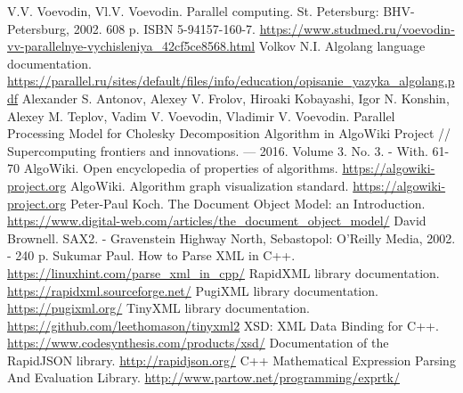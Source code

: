 %
%

\begin{thebibliography}{}




V.V. Voevodin, Vl.V. Voevodin. Parallel computing. St. Petersburg: BHV-Petersburg, 2002. 608 p. ISBN 5-94157-160-7. \url{https://www.studmed.ru/voevodin-vv-parallelnye-vychisleniya\_42cf5ce8568.html}
Volkov N.I. Algolang language documentation. \url{https://parallel.ru/sites/default/files/info/education/opisanie\_yazyka\_algolang.pdf}
Alexander S. Antonov, Alexey V. Frolov, Hiroaki Kobayashi, Igor N. Konshin, Alexey M. Teplov, Vadim V. Voevodin, Vladimir V. Voevodin. Parallel Processing Model for Cholesky Decomposition Algorithm in AlgoWiki Project // Supercomputing frontiers and innovations. — 2016. Volume 3. No. 3. - With. 61-70
AlgoWiki. Open encyclopedia of properties of algorithms. \url{https://algowiki-project.org}
AlgoWiki. Algorithm graph visualization standard. \url{https://algowiki-project.org}
Peter-Paul Koch. The Document Object Model: an Introduction. \url{https://www.digital-web.com/articles/the\_document\_object\_model/}
David Brownell. SAX2. - Gravenstein Highway North, Sebastopol: O’Reilly Media, 2002. - 240 p.
Sukumar Paul. How to Parse XML in C++. \url{https://linuxhint.com/parse\_xml\_in\_cpp/}
RapidXML library documentation. \url{https://rapidxml.sourceforge.net/}
PugiXML library documentation. \url{https://pugixml.org/}
TinyXML library documentation. \url{https://github.com/leethomason/tinyxml2}
XSD: XML Data Binding for C++. \url{https://www.codesynthesis.com/products/xsd/}
Documentation of the RapidJSON library. \url{http://rapidjson.org/}
C++ Mathematical Expression Parsing And Evaluation Library. \url{http://www.partow.net/programming/exprtk/}

\end{thebibliography}
